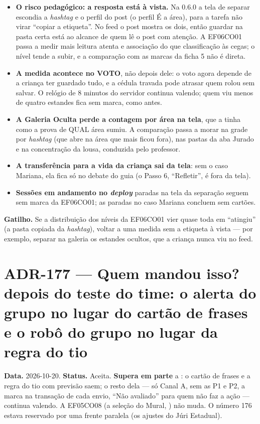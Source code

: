 \begin{itemize}
  \item \textbf{O risco pedagógico: a resposta está à vista.} Na 0.6.0 a tela
    de separar escondia a \emph{hashtag} e o perfil do post (o perfil É a
    área), para a tarefa não virar \enquote{copiar a etiqueta}. No feed o post
    mostra os dois, então guardar na pasta certa está ao alcance de quem lê o
    post com atenção. A EF06CO01 passa a medir mais leitura atenta e
    associação do que classificação às cegas; o nível tende a subir, e a
    comparação com as marcas da ficha 5 não é direta.
  \item \textbf{A medida acontece no VOTO}, não depois dele: o voto agora
    depende de a criança ter guardado tudo, e a cédula travada pode atrasar
    quem rolou sem salvar. O relógio de 8 minutos do servidor continua
    valendo; quem viu menos de quatro estandes fica sem marca, como antes.
  \item \textbf{A Galeria Oculta perde a contagem por área na tela}, que a
     tinha como a prova de QUAL área sumiu. A comparação passa a
    morar na grade por \emph{hashtag} (que abre na área que mais ficou fora),
    nas pastas da aba Jurado e na concentração da lousa, conduzida pelo
    professor.
  \item \textbf{A transferência para a vida da criança sai da tela}: sem o caso
    Mariana, ela fica só no debate do guia (o Passo 6, \enquote{Refletir}, é
    fora da tela).
  \item \textbf{Sessões em andamento no \emph{deploy}} paradas na tela da
    separação seguem sem marca da EF06CO01; as paradas no caso Mariana concluem
    sem cartões.
\end{itemize}

\textbf{Gatilho.} Se a distribuição dos níveis da EF06CO01 vier quase toda em
\enquote{atingiu} (a pasta copiada da \emph{hashtag}), voltar a uma medida sem a
etiqueta à vista --- por exemplo, separar na galeria os estandes ocultos, que a
criança nunca viu no feed.

\section{ADR-177 --- Quem mandou isso? depois do teste do time: o alerta do grupo no lugar do cartão de frases e o robô do grupo no lugar da regra do tio}
\label{adr:exp05ef1b-alerta-e-robo}

\textbf{Data.} 2026-10-20. \textbf{Status.} Aceita. \textbf{Supera em parte}
a : o cartão de frases e a regra do tio com previsão saem; o
resto dela --- só Canal A, sem as P1 e P2, a marca na transação de cada
envio, \enquote{Não avaliado} para quem não faz a ação --- continua valendo.
A EF05CO08 (a seleção do Mural, ) não muda. O número 176
estava reservado por uma frente paralela (os ajustes do Júri Estadual).

